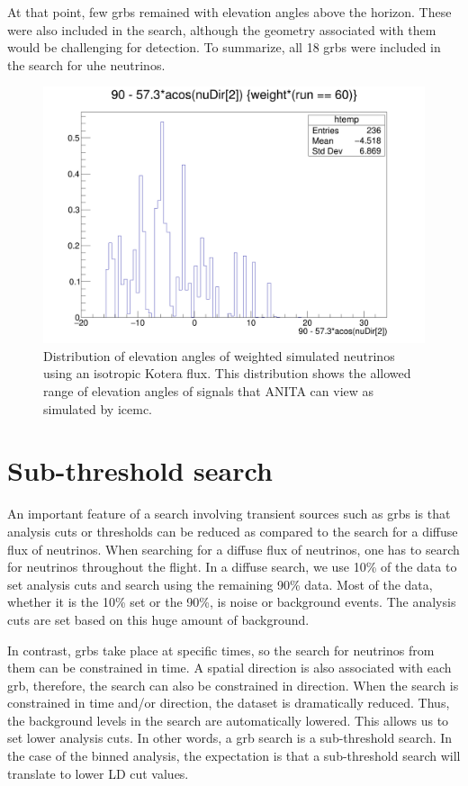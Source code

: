 At that point, few \gls{grbs} remained with elevation angles above the horizon. These were also included in the search, although the geometry associated with them would be challenging for detection. To summarize, all 18 \gls{grbs} were included in the search for \gls{uhe} neutrinos. 

\begin{figure}
\centering
\includegraphics[width=.8\textwidth]{figures/koteraMarch30_acos_nuDir2_weighted.png}
\caption{Distribution of elevation angles of weighted simulated neutrinos using an isotropic Kotera flux. This distribution shows the allowed range of elevation angles of signals that ANITA can view as simulated by icemc.}
\label{nuDir_kotera_isotropic}
\end{figure}


\section{Sub-threshold search}

An important feature of a search involving transient sources such as \gls{grbs} is that analysis cuts or thresholds can be reduced as compared to the search for a diffuse flux of neutrinos. When searching for a diffuse flux of neutrinos, one has to search for neutrinos throughout the flight. In a diffuse search, we use 10\% of the data to set analysis cuts and search using the remaining 90\% data. Most of the data, whether it is the 10\% set or the 90\%, is noise or background events. The analysis cuts are set based on this huge amount of background. 

In contrast, \gls{grbs} take place at specific times, so the search for neutrinos from them can be constrained in time. A spatial direction is also associated with each \gls{grb}, therefore, the search can also be constrained in direction. When the search is constrained in time and/or direction, the dataset is dramatically reduced. Thus, the background levels in the search are automatically lowered. This allows us to set lower analysis cuts. In other words, a \gls{grb} search is a sub-threshold search. In the case of the binned analysis, the expectation is that a sub-threshold search will translate to lower LD cut values.

